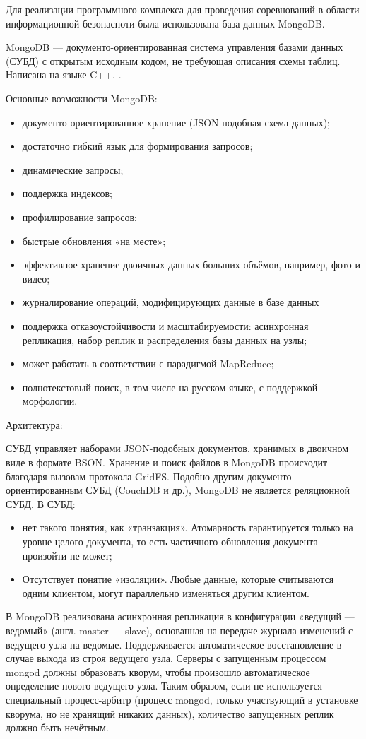 Для реализации программного комплекса для проведения соревнований в области информационной безопасноти была использована база данных MongoDB.

MongoDB --- документо-ориентированная система управления базами данных (СУБД) с открытым исходным кодом, не требующая описания схемы таблиц. Написана на языке C++. \cite{progit}.

Основные возможности MongoDB:
\begin{itemize}
\item документо-ориентированное хранение (JSON-подобная схема данных);
\item достаточно гибкий язык для формирования запросов;
\item динамические запросы;
\item поддержка индексов;
\item профилирование запросов;
\item быстрые обновления «на месте»;
\item эффективное хранение двоичных данных больших объёмов, например, фото и видео;
\item журналирование операций, модифицирующих данные в базе данных
\item поддержка отказоустойчивости и масштабируемости: асинхронная репликация, набор реплик и распределения базы данных на узлы;
\item может работать в соответствии с парадигмой MapReduce;
\item полнотекстовый поиск, в том числе на русском языке, с поддержкой морфологии.
\end{itemize}

Архитектура:

СУБД управляет наборами JSON-подобных документов, хранимых в двоичном виде в формате BSON. Хранение и поиск файлов в MongoDB происходит благодаря вызовам протокола GridFS. Подобно другим документо-ориентированным СУБД (CouchDB и др.), MongoDB не является реляционной СУБД. В СУБД:

\begin{itemize}
\item нет такого понятия, как «транзакция». Атомарность гарантируется только на уровне целого документа, то есть частичного обновления документа произойти не может;
\item Отсутствует понятие «изоляции». Любые данные, которые считываются одним клиентом, могут параллельно изменяться другим клиентом.
\end{itemize}

В MongoDB реализована асинхронная репликация в конфигурации «ведущий — ведомый» (англ. master — slave), основанная на передаче журнала изменений с ведущего узла на ведомые. Поддерживается автоматическое восстановление в случае выхода из строя ведущего узла. Серверы с запущенным процессом mongod должны образовать кворум, чтобы произошло автоматическое определение нового ведущего узла. Таким образом, если не используется специальный процесс-арбитр (процесс mongod, только участвующий в установке кворума, но не хранящий никаких данных), количество запущенных реплик должно быть нечётным.
